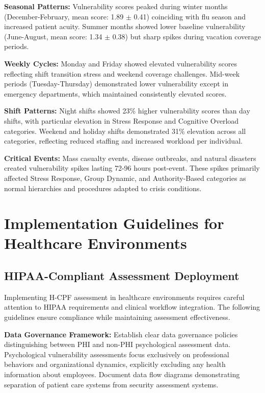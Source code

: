 \documentclass[10pt, twocolumn]{article}
\begin{document}
\textbf{Seasonal Patterns:} Vulnerability scores peaked during winter months (December-February, mean score: 1.89 $\pm$ 0.41) coinciding with flu season and increased patient acuity. Summer months showed lower baseline vulnerability (June-August, mean score: 1.34 $\pm$ 0.38) but sharp spikes during vacation coverage periods.

\textbf{Weekly Cycles:} Monday and Friday showed elevated vulnerability scores reflecting shift transition stress and weekend coverage challenges. Mid-week periods (Tuesday-Thursday) demonstrated lower vulnerability except in emergency departments, which maintained consistently elevated scores.

\textbf{Shift Patterns:} Night shifts showed 23\% higher vulnerability scores than day shifts, with particular elevation in Stress Response and Cognitive Overload categories. Weekend and holiday shifts demonstrated 31\% elevation across all categories, reflecting reduced staffing and increased workload per individual.

\textbf{Critical Events:} Mass casualty events, disease outbreaks, and natural disasters created vulnerability spikes lasting 72-96 hours post-event. These spikes primarily affected Stress Response, Group Dynamic, and Authority-Based categories as normal hierarchies and procedures adapted to crisis conditions.

\section{Implementation Guidelines for Healthcare Environments}

\subsection{HIPAA-Compliant Assessment Deployment}

Implementing H-CPF assessment in healthcare environments requires careful attention to HIPAA requirements and clinical workflow integration. The following guidelines ensure compliance while maintaining assessment effectiveness.

\textbf{Data Governance Framework:} Establish clear data governance policies distinguishing between PHI and non-PHI psychological assessment data. Psychological vulnerability assessments focus exclusively on professional behaviors and organizational dynamics, explicitly excluding any health information about employees. Document data flow diagrams demonstrating separation of patient care systems from security assessment systems.
\end{document}
